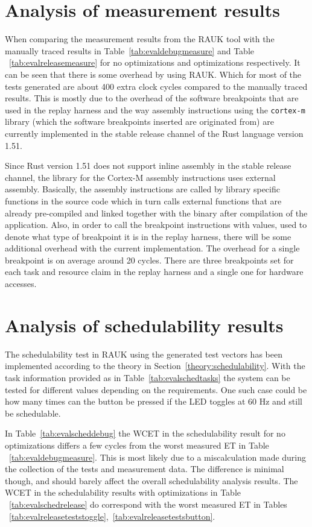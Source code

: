 \section{Analysis of measurement results}
\label{discussion:measurement}
When comparing the measurement results from the RAUK tool with the manually
traced results in Table~\ref{tab:evaldebugmeasure} and Table
~\ref{tab:evalreleasemeasure} for no optimizations and optimizations
respectively. It can be seen that there is some overhead by using RAUK\@. Which
for most of the tests generated are about 400 extra clock cycles compared to
the manually traced results. This is mostly due to the overhead of the software
breakpoints that are used in the replay harness and the way assembly
instructions using the \texttt{cortex-m} library (which the software
breakpoints inserted are originated from) are currently implemented in the
stable release channel of the Rust language version 1.51.

Since Rust version 1.51 does not support inline assembly in the stable release
channel, the library for the Cortex-M assembly instructions uses external
assembly. Basically, the assembly instructions are called by library specific
functions in the source code which in turn calls external functions that are
already pre-compiled and linked together with the binary after compilation of
the application. Also, in order to call the breakpoint instructions with values,
used to denote what type of breakpoint it is in the replay harness, there will
be some additional overhead with the current implementation. The overhead for a
single breakpoint is on average around 20 cycles. There are three breakpoints
set for each task and resource claim in the replay harness and a single one for
hardware accesses.

\section{Analysis of schedulability results}
The schedulability test in RAUK using the generated test vectors has been
implemented according to the theory in Section~\ref{theory:schedulability}.
With the task information provided as in Table~\ref{tab:evalschedtasks} the
system can be tested for different values depending on the requirements. One
such case could be how many times can the button be pressed if the LED toggles
at 60 Hz and still be schedulable.

In Table~\ref{tab:evalscheddebug} the WCET in the schedulability result for no
optimizations differs a few cycles from the worst measured ET in Table
~\ref{tab:evaldebugmeasure}. This is most likely due to a miscalculation made
during the collection of the tests and measurement data. The difference is
minimal though, and should barely affect the overall schedulability analysis
results. The WCET in the schedulability results with optimizations in Table
~\ref{tab:evalschedrelease} do correspond with the worst measured ET in Tables
~\ref{tab:evalreleaseteststoggle},~\ref{tab:evalreleasetestsbutton}.

